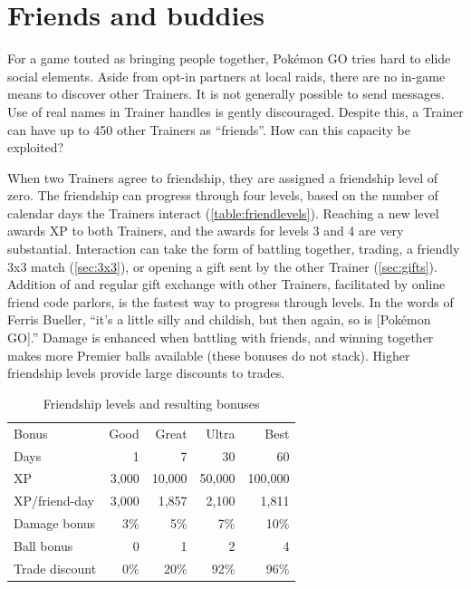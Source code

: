 \chapter{Friends and buddies\label{chap:friends}}
For a game touted as bringing people together, Pokémon GO tries hard to elide social elements.
Aside from opt-in partners at local raids, there are no in-game means to discover other Trainers.
It is not generally possible to send messages.
Use of real names in Trainer handles is gently discouraged.
Despite this, a Trainer can have up to 450 other Trainers as ``friends''.
How can this capacity be exploited?

When two Trainers agree to friendship, they are assigned a friendship level of zero.
The friendship can progress through four levels, based on the number of calendar
  days the Trainers interact (\autoref{table:friendlevels}).
Reaching a new level awards XP to both Trainers, and the awards for levels 3 and 4 are very substantial.
Interaction can take the form of battling together, trading, a friendly 3x3 match (\autoref{sec:3x3}), or
  opening a gift sent by the other Trainer (\autoref{sec:gifts}).
Addition of and regular gift exchange with other Trainers, facilitated by online friend code parlors,
  is the fastest way to progress through levels.
In the words of Ferris Bueller, ``it's a little silly and childish, but then again, so is [Pokémon GO].''
Damage is enhanced when battling with friends, and winning together
  makes more Premier balls available (these bonuses do not stack).
Higher friendship levels provide large discounts to trades.
\begin{table}
\centering
\begin{tabular}{lrrrr}
Bonus & Good & Great & Ultra & Best\\
\Midrule
Days & 1 & 7 & 30 & 60\\
XP  & 3,000 & 10,000 & 50,000 & 100,000\\
XP/friend-day & 3,000 & 1,857 & 2,100 & 1,811\\
Damage bonus & 3\% & 5\% & 7\% & 10\%\\
Ball bonus & 0 & 1 & 2 & 4\\
Trade discount & 0\% & 20\% & 92\% & 96\% \\
\end{tabular}
  \caption{Friendship levels and resulting bonuses\label{table:friendlevels}}
\end{table}

